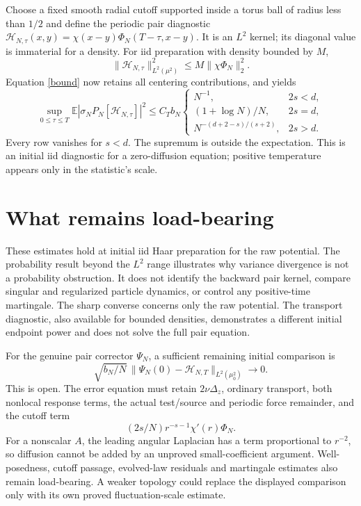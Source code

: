 \documentclass[11pt]{article}
\newcommand{\E}{\mathbb E}
\begin{document}
Choose a fixed smooth radial cutoff supported inside a torus ball of
radius less than $1/2$ and define the periodic pair diagnostic
$\mathcal H_{N,\tau}(x,y)=\chi(x-y)\Phi_N(T-\tau,x-y)$.
It is an $L^2$ kernel; its diagonal value is immaterial for a density.
For iid preparation with density bounded by $M$,
\[
 \|\mathcal H_{N,\tau}\|_{L^2(\mu^2)}^2
 \le M\|\chi\Phi_N\|_2^2.
\]
Equation \eqref{bound} now retains all centering contributions, and yields
\[
 \sup_{0\le\tau\le T}\E|\sigma_NP_N[\mathcal H_{N,\tau}]|^2
 \le C_T b_N\begin{cases}
  N^{-1},&2s<d,\\
  (1+\log N)/N,&2s=d,\\
  N^{-(d+2-s)/(s+2)},&2s>d.
 \end{cases}
\]
Every row vanishes for $s<d$. The supremum is outside the expectation.
This is an initial iid diagnostic for a zero-diffusion equation; positive
temperature appears only in the statistic's scale.

\section{What remains load-bearing}
These estimates hold at initial iid Haar preparation for the raw potential.
The probability result beyond the $L^2$ range illustrates why variance
divergence is not a probability obstruction. It does not identify the
backward pair kernel, compare singular and regularized particle dynamics,
or control any positive-time martingale. The sharp converse concerns only
the raw potential. The transport diagnostic, also available for bounded
densities, demonstrates a different initial endpoint power and does not
solve the full pair equation.

For the genuine pair corrector $\Psi_N$, a sufficient remaining initial
comparison is
\[
 \sqrt{b_N/N}\,
 \|\Psi_N(0)-\mathcal H_{N,T}\|_{L^2(\mu_0^2)}\longrightarrow0.
\]
This is open. The error equation must retain $2\nu\Delta_z$, ordinary
transport, both nonlocal response terms, the actual test/source and
periodic force remainder, and the cutoff term
\[
 (2s/N)r^{-s-1}\chi'(r)\Phi_N.
\]
For a nonscalar $A$, the leading
angular Laplacian has a term proportional to $r^{-2}$, so diffusion
cannot be added by an unproved small-coefficient argument. Well-posedness,
cutoff passage, evolved-law residuals and martingale estimates also remain
load-bearing. A weaker topology could replace the displayed comparison
only with its own proved fluctuation-scale estimate.
\end{document}
